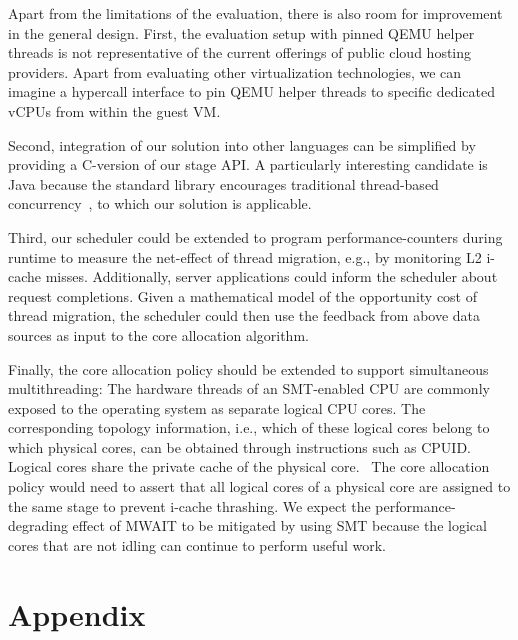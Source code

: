 \documentclass[12pt,a4paper]{book}
\begin{document}
Apart from the limitations of the evaluation, there is also room for improvement in the general design.
First, the evaluation setup with pinned QEMU helper threads is not representative of the current offerings of public cloud hosting providers.
Apart from evaluating other virtualization technologies, we can imagine a hypercall interface to pin QEMU helper threads to specific dedicated vCPUs from within the guest VM.


Second, integration of our solution into other languages can be simplified by providing a C-version of our stage API.
A particularly interesting candidate is Java because the standard library encourages traditional thread-based concurrency~\cite{javaThreadConcurrency}, to which our solution is applicable.

Third, our scheduler could be extended to program performance-counters during runtime to measure the net-effect of thread migration, e.g., by monitoring L2 i-cache misses.
Additionally, server applications could inform the scheduler about request completions.
Given a mathematical model of the opportunity cost of thread migration, the scheduler could then use the feedback from above data sources as input to the core allocation algorithm.

Finally, the core allocation policy should be extended to support simultaneous multithreading:
The hardware threads of an SMT-enabled CPU are commonly exposed to the operating system as separate logical CPU cores.
The corresponding topology information, i.e., which of these logical cores belong to which physical cores, can be obtained through instructions such as CPUID.~\cite{intelSDMTopology}
Logical cores share the private cache of the physical core.~\cite{intelSDMHyperthreading}
The core allocation policy would need to assert that all logical cores of a physical core are assigned to the same stage to prevent i-cache thrashing.
We expect the performance-degrading effect of MWAIT to be mitigated by using SMT because the logical cores that are not idling can continue to perform useful work.~\cite{intelSDMHyperthreading}

\backmatter

\chapter{Appendix}\label{ch:appendix}
\end{document}
